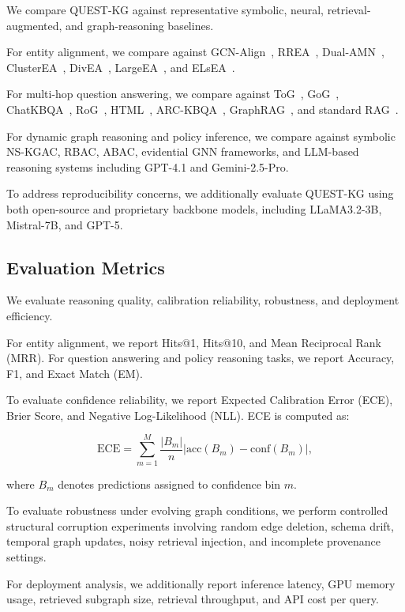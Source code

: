 \documentclass[sigconf,review,anonymous]{acmart}
\begin{document}
We compare QUEST-KG against representative symbolic, neural, retrieval-augmented, and graph-reasoning baselines.

For entity alignment, we compare against GCN-Align~\cite{gcnalign}, RREA~\cite{rrea}, Dual-AMN~\cite{dualamn}, ClusterEA~\cite{clusterea}, DivEA~\cite{divea}, LargeEA~\cite{largeea}, and ELsEA~\cite{elsea}.

For multi-hop question answering, we compare against ToG~\cite{tog}, GoG~\cite{gog}, ChatKBQA~\cite{chatkbqa}, RoG~\cite{rog}, HTML~\cite{html}, ARC-KBQA~\cite{arckbqa}, GraphRAG~\cite{edge2024graphrag}, and standard RAG~\cite{lewis2020retrieval}.

For dynamic graph reasoning and policy inference, we compare against symbolic NS-KGAC, RBAC, ABAC, evidential GNN frameworks, and LLM-based reasoning systems including GPT-4.1 and Gemini-2.5-Pro.

To address reproducibility concerns, we additionally evaluate QUEST-KG using both open-source and proprietary backbone models, including LLaMA3.2-3B, Mistral-7B, and GPT-5.

\subsection{Evaluation Metrics}

We evaluate reasoning quality, calibration reliability, robustness, and deployment efficiency.

For entity alignment, we report Hits@1, Hits@10, and Mean Reciprocal Rank (MRR). For question answering and policy reasoning tasks, we report Accuracy, F1, and Exact Match (EM).

To evaluate confidence reliability, we report Expected Calibration Error (ECE), Brier Score, and Negative Log-Likelihood (NLL). ECE is computed as:

\[
\text{ECE}
=
\sum_{m=1}^{M}
\frac{|B_m|}{n}
\left|
\text{acc}(B_m)-\text{conf}(B_m)
\right|,
\]

where $B_m$ denotes predictions assigned to confidence bin $m$.

To evaluate robustness under evolving graph conditions, we perform controlled structural corruption experiments involving random edge deletion, schema drift, temporal graph updates, noisy retrieval injection, and incomplete provenance settings.

For deployment analysis, we additionally report inference latency, GPU memory usage, retrieved subgraph size, retrieval throughput, and API cost per query.
\end{document}
